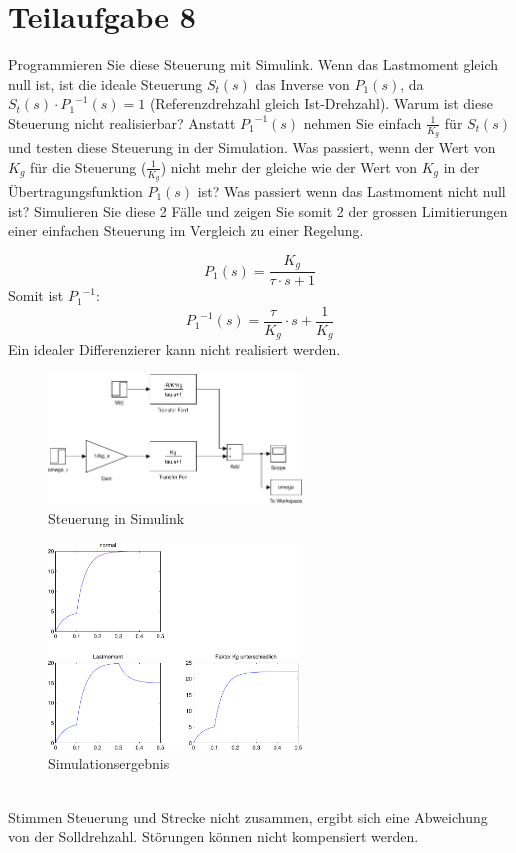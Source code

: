 \section{Teilaufgabe 8}
\begin{aufgabe}
    Programmieren Sie diese Steuerung mit Simulink. Wenn das Lastmoment gleich 
    null ist, ist die ideale Steuerung $S_t(s)$ das Inverse von $P_1(s)$, da 
    $S_t(s) \cdot {P_1}^{-1}(s) = 1$ (Referenzdrehzahl gleich Ist-Drehzahl). 
    Warum ist diese Steuerung nicht realisierbar? Anstatt ${P_1}^{-1}(s)$ 
    nehmen Sie einfach $\frac{1}{K_g}$ für $S_t(s)$ und testen diese Steuerung 
    in der Simulation.  Was passiert, wenn der Wert von $K_g$ für die 
    Steuerung ($\frac{1}{K_g}$) nicht mehr der gleiche wie der Wert von $K_g$ 
    in der Übertragungsfunktion $P_1(s)$ ist? Was passiert wenn das Lastmoment 
    nicht null ist? Simulieren Sie diese 2 Fälle und zeigen Sie somit 2 
    der grossen Limitierungen einer einfachen Steuerung im Vergleich zu einer 
    Regelung.
\end{aufgabe}
\[ P_1(s) = \frac{K_g}{\tau \cdot s + 1} \]
Somit ist ${P_1}^{-1}$:
\[ {P_1}^{-1}(s) = \frac{\tau}{K_g} \cdot s + \frac{1}{K_g} \]
Ein idealer Differenzierer kann nicht realisiert werden. 
\begin{figure}[h!]
    \centering
    \includegraphics[width=0.6\textwidth]{08/steuerung.pdf}
    \caption{Steuerung in Simulink}
    \label{fig:03}
\end{figure}
\begin{figure}[h!]
    \centering
    \includegraphics[width=0.6\textwidth]{08/steuerung_plot.pdf}
    \caption{Simulationsergebnis}
    \label{fig:08plot}
\end{figure}
\\
Stimmen Steuerung und Strecke nicht zusammen, ergibt sich eine Abweichung 
von der Solldrehzahl. Störungen können nicht kompensiert werden. 
